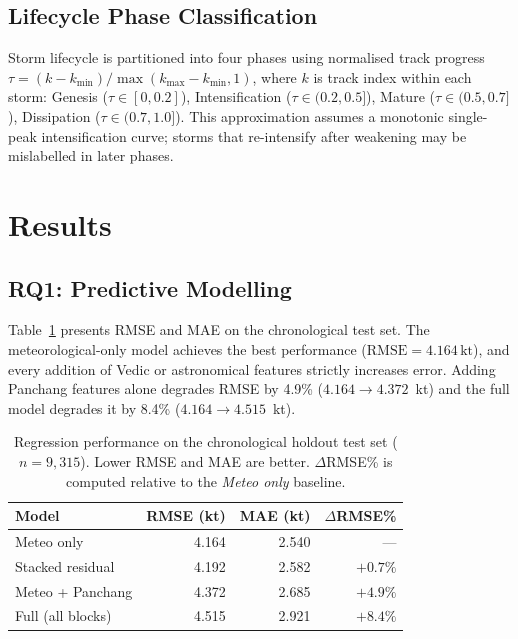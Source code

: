 \documentclass[12pt,a4paper]{article}
\newcommand{\rmse}[1]{\text{RMSE} = #1\,\text{kt}}
\begin{document}
\subsection{Lifecycle Phase Classification}

Storm lifecycle is partitioned into four phases using normalised track
progress $\tau = (k - k_{\min}) / \max(k_{\max} - k_{\min}, 1)$, where $k$ is
track index within each storm:
Genesis ($\tau \in [0, 0.2]$), Intensification ($\tau \in (0.2, 0.5]$),
Mature ($\tau \in (0.5, 0.7]$), Dissipation ($\tau \in (0.7, 1.0]$).
This approximation assumes a monotonic single-peak intensification curve;
storms that re-intensify after weakening may be mislabelled in later phases.

\section{Results}
\label{sec:results}

\subsection{RQ1: Predictive Modelling}
\label{sec:rq1}

Table~\ref{tab:rmse} presents RMSE and MAE on the chronological test set.
The meteorological-only model achieves the best performance ($\rmse{4.164}$),
and every addition of Vedic or astronomical features strictly increases error.
Adding Panchang features alone degrades RMSE by 4.9\% ($4.164 \to 4.372$~kt)
and the full model degrades it by 8.4\% ($4.164 \to 4.515$~kt).

\begin{table}[H]
  \centering
  \caption{Regression performance on the chronological holdout test set
           ($n = 9{,}315$). Lower RMSE and MAE are better.
           $\Delta$RMSE\% is computed relative to the \textit{Meteo only} baseline.}
  \label{tab:rmse}
  \begin{tabular}{lrrr}
    \toprule
    \textbf{Model} & \textbf{RMSE (kt)} & \textbf{MAE (kt)} & \boldmath$\Delta$\textbf{RMSE\%} \\
    \midrule
    Meteo only            & 4.164 & 2.540 & --- \\
    Stacked residual      & 4.192 & 2.582 & $+0.7\%$ \\
    Meteo + Panchang      & 4.372 & 2.685 & $+4.9\%$ \\
    Full (all blocks)     & 4.515 & 2.921 & $+8.4\%$ \\
    \bottomrule
  \end{tabular}
\end{table}
\end{document}
